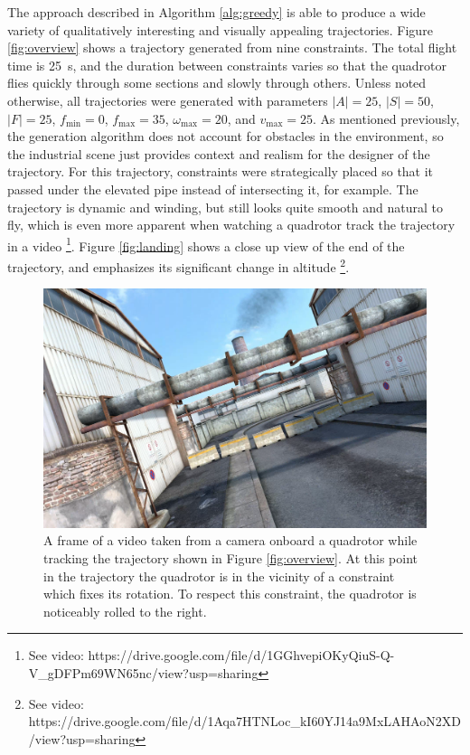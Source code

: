 \documentclass[pageno]{jpaper}
\begin{document}
The approach described in Algorithm \ref{alg:greedy} is able to produce a wide variety of qualitatively interesting and visually appealing trajectories. Figure \ref{fig:overview} shows a trajectory generated from nine constraints. The total flight time is \qty{25}{s}, and the duration between constraints varies so that the quadrotor flies quickly through some sections and slowly through others. Unless noted otherwise, all trajectories were generated with parameters $|A| = 25$, $|S| = 50$, $|F| = 25$, $f_{\min} = 0$, $f_{\max} = 35$, $\omega_{\max} = 20$, and $v_{\max} = 25$. As mentioned previously, the generation algorithm does not account for obstacles in the environment, so the industrial scene just provides context and realism for the designer of the trajectory. For this trajectory, constraints were strategically placed so that it passed under the elevated pipe instead of intersecting it, for example. The trajectory is dynamic and winding, but still looks quite smooth and natural to fly, which is even more apparent when watching a quadrotor track the trajectory in a video \footnote{See video: https://drive.google.com/file/d/1GGhvepiOKyQiuS-Q-V\_gDFPm69WN65nc/view?usp=sharing}. Figure \ref{fig:landing} shows a close up view of the end of the trajectory, and emphasizes its significant change in altitude \footnote{See video: https://drive.google.com/file/d/1Aqa7HTNLoc\_kI60YJ14a9MxLAHAoN2XD/view?usp=sharing}.

\begin{figure}
  \centering
  \includegraphics[width=0.75\linewidth]{data/onboard.png}
  \caption{A frame of a video taken from a camera onboard a quadrotor while tracking the trajectory shown in Figure \ref{fig:overview}. At this point in the trajectory the quadrotor is in the vicinity of a constraint which fixes its rotation. To respect this constraint, the quadrotor is noticeably rolled to the right.}
  \label{fig:onboard}
\end{figure}
\end{document}
